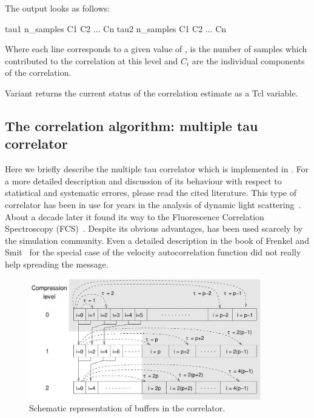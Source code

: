 The output looks as follows:
\begin{code}
tau1 n_samples C1 C2 ... Cn
tau2 n_samples C1 C2 ... Cn
\end{code}
Where each line corresponds to a given value of ,  is the number
of samples which contributed to the correlation at this level and $C_i$ are the individual
components of the correlation.

Variant  returns the current status of the correlation
estimate as a Tcl variable. 



\subsection{The correlation algorithm: multiple tau correlator}
\label{sec:multipleTau}

Here we briefly describe the multiple tau correlator which is implemented in \es.
For a more detailed description and discussion of its behaviour with respect to
statistical and systematic errores, please read the cited literature.
This type of correlator has been in use for years in the analysis of
dynamic light scattering~\cite{schatzel88a}. About a decade later it found its way
to the Fluorescence Correlation Spectroscopy (FCS)~\cite{magatti01a}.
Despite its obvious advantages, has been used scarcely by the simulation community.
Even a detailed description in the book of Frenkel and Smit~\cite{frenkel02b}
for the special case of the velocity autocorrelation function did not really
help spreading the message.

\begin{figure}[ht]
\begin{center} 
\includegraphics[width=0.9\textwidth]{figures/correlator_scheme}
\end{center} 
\caption{Schematic representation of buffers in the correlator.}
\label{fig:dataSet}
\end{figure}


